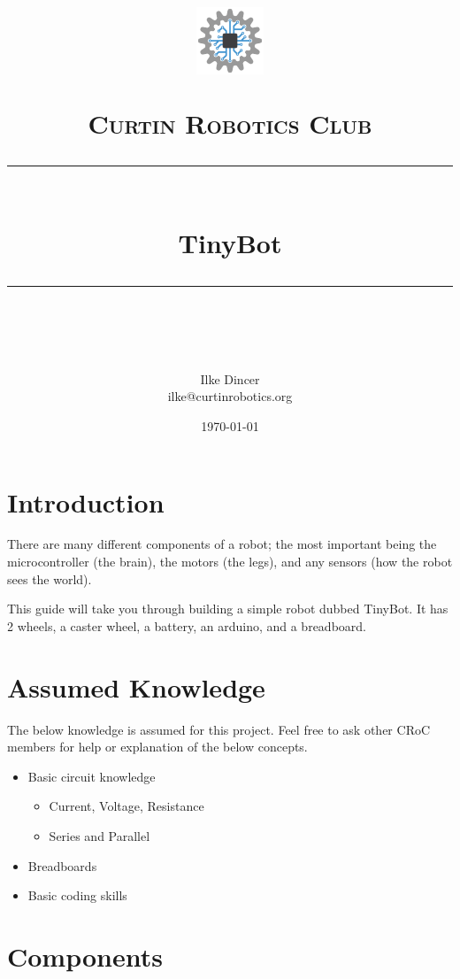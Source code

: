 \documentclass[a4paper,12pt]{article}
\title{	
    \begin{center}
        \includegraphics[width=0.15\textwidth]{CRoCLogo(mediumquality).png}
    \end{center}
	\normalfont\normalsize
	\textsc{Curtin Robotics Club}\\ %
	\vspace{25pt} %
	\rule{\linewidth}{0.5pt}\\ %
	\vspace{20pt} %
    {\huge TinyBot }\\
	\vspace{12pt} %
	\rule{\linewidth}{2pt}\\ %
	\vspace{12pt} %
}
\author{\LARGE Ilke Dincer \\ \small ilke@curtinrobotics.org} %
\date{\normalsize\today} %
\begin{document}
\maketitle

\pagebreak
{}
\tableofcontents

\pagebreak
{}

\section{Introduction}

There are many different components of a robot; the most important being the microcontroller (the brain), the motors (the legs), and any sensors (how the robot sees the world).

This guide will take you through building a simple robot dubbed TinyBot. It has 2 wheels, a caster wheel, a battery, an arduino, and a breadboard.

\section{Assumed Knowledge}

The below knowledge is assumed for this project. Feel free to ask other CRoC members for help or explanation of the below concepts.


\begin{itemize}
    \item Basic circuit knowledge
    \begin{itemize}
        \item Current, Voltage, Resistance
        \item Series and Parallel
    \end{itemize}
    \item Breadboards
    \item Basic coding skills
\end{itemize}

\section{Components}\label{sec:components}
 
\end{document}
